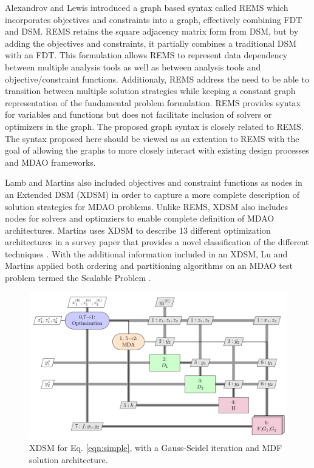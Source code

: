     Alexandrov and Lewis introduced a graph based syntax called REMS which 
    incorporates objectives and constraints into a graph, effectively combining 
    FDT and DSM\cite{alexandrov2004}. REMS retains the square adjacency 
    matrix form from DSM, but by adding the objectives and constraints, it partially 
    combines a traditional DSM with an FDT. This formulation allows REMS to represent data 
    dependency between multiple analysis tools as well as between analysis tools and
    objective/constraint functions. Additionaly, REMS address the need to be able to 
    transition between multiple solution strategies while keeping a constant 
    graph representation of the fundamental problem formulation. REMS provides
    syntax for variables and functions but does not facilitate inclusion 
    of solvers or optimizers in the graph.  The 
    proposed graph syntax is closely related to REMS. The syntax proposed here should 
    be viewed as an extention to REMS with the goal of allowing the graphs to more 
    closely interact with existing design processes and MDAO frameworks. 

    Lamb and Martins also included objectives and constraint functions as nodes 
    in an Extended DSM (XDSM) in order to capture a more complete description 
    of solution strategies for MDAO problems\cite{Lambe2012}. Unlike REMS, 
    XDSM also includes nodes for solvers and optimziers to enable complete 
    definition of MDAO architectures. Martins uses XDSM to describe 13 different 
    optimization architectures in a survey paper that provides a novel 
    classification of the different techniques \cite{Lambe2011}. With the 
    additional information included in an XDSM, Lu and Martins applied both 
    ordering and partitioning algorithms on an MDAO test problem termed the 
    Scalable Problem \cite{Lu2012}. 

    \begin{figure}
        \begin{center}
        \includegraphics[height=.25\textheight]{XDSM/simple}
        \caption{XDSM for Eq. \ref{eqn:simple}, with a Gauss-Seidel iteration 
          and MDF solution architecture. \label{fig:XDSM_simple}}
        \end{center}
    \end{figure}


